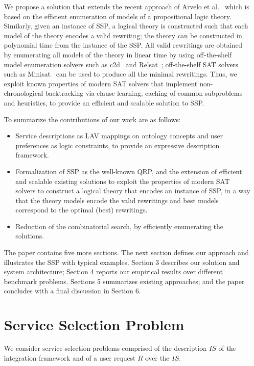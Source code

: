 \documentclass{llncs}
\begin{document}
We propose a solution that extends the recent approach of Arvelo et
al.\ \cite{arvelo:aaai06} which is based on the efficient enumeration
of models of a propositional logic  theory. Similarly, given an
instance of SSP, a logical theory is constructed such  that each model
of the theory encodes a valid rewriting; the theory can be constructed
in polynomial time from the instance of the SSP. All valid
rewritings  are obtained by enumerating all models of the theory in
linear time by using  off-the-shelf model enumeration solvers such as
c2d~\cite{c2d} and Relsat~\cite{relsat}; off-the-shelf SAT solvers
such as Minisat~\cite{minisat} can be used to produce all the minimal
rewritings. Thus, we exploit known properties of modern SAT solvers
that  implement non-chronological backtracking via clause learning,
caching of common  subproblems and heuristics, to provide an efficient
and scalable solution to SSP. 

To summarize the contributions of our work are as follows:
\begin{itemize}
\item Service descriptions as LAV mappings on ontology concepts and user preferences as logic constraints, to provide an expressive description framework.
\item Formalization of SSP as the well-known QRP, and the extension of efficient and scalable existing solutions to exploit the properties of modern SAT solvers to construct a logical theory that encodes an instance of SSP, in a way that the theory models encode the valid rewritings and best models 
correspond to the optimal (best) rewritings.
\item Reduction of the combinatorial search, by efficiently enumerating the solutions.
\end{itemize}

The paper contains five more sections. The next section defines our
approach  and illustrates the SSP with typical examples. Section 3
describes our solution  and system architecture; Section 4 reports our
empirical results over different benchmark problems. Sections 5
summarizes existing approaches; and the paper  concludes with a final
discussion in Section 6.

\section{Service Selection Problem}
We consider service selection problems comprised of the
description $IS$ of the integration framework and of a
user request $R$ over the $IS$.
\end{document}
